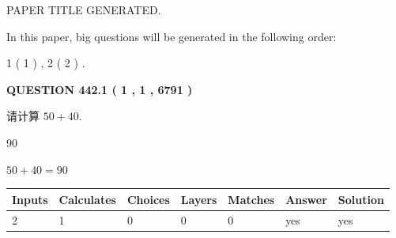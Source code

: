 \documentclass{ctexart}
\begin{document}
   
\vspace{0.2in}
   
   
   
   
   
   
   
   
 \vspace{0.2in}
 
 
 
 
   
   
 PAPER TITLE GENERATED.
   
   
   
\vspace{0.2in}
   
In this paper, big questions will be generated in the following order: 
   
   
   1 ( 1 )
 ,
   2 ( 2 )
 .
  
\vspace{0.2in}
  
{\textbf{\Large{QUESTION
442.1 
 ( 1 , 1 , 6791 )
}}}
  
  
 
请计算 $ %
50 +  %
40 $.
 
 
 
\noindent{}
 
 

90
 
 
\noindent{}
 
 

 
 
 
\noindent{}
 
 

$ %
50 +  %
40=   %
90$
 
 
\noindent{}
 
 

 
   
   
   
   
\noindent\begin{tabular}{|l|l|l|l|l|l|l|}
 \hline
Inputs & Calculates & Choices & Layers & Matches & Answer & Solution \\ \hline
 2  & 
 1  & 
 0
  & 
 0  & 
 0  & 
  yes & 
  yes 
  \\ \hline
 \end{tabular}
   
\end{document}
